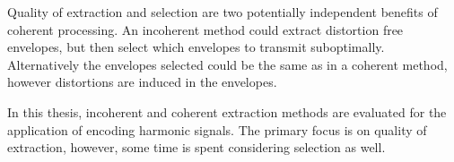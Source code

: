 \documentclass [11pt, proquest,oneside] {ganter_thesis}[2015/03/03]
\begin{document}
Quality of extraction and selection are two potentially independent benefits of coherent processing.  An incoherent method could extract distortion free envelopes, but then select which envelopes to transmit suboptimally.  Alternatively the envelopes selected could be the same as in a coherent method, however distortions are induced in the envelopes.

In this thesis, incoherent and coherent extraction methods are evaluated for the application of encoding harmonic signals.  The primary focus is on quality of extraction, however, some time is spent considering selection as well.










\end{document}
